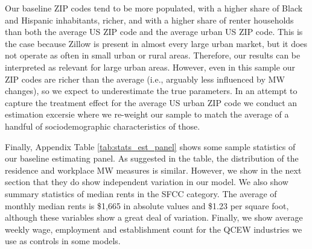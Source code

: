 Our baseline ZIP codes tend to be more populated, with a higher share of Black 
and Hispanic inhabitants, richer, and with a higher share of renter households 
than both the average US ZIP code and the average urban US ZIP code.
This is the case because Zillow is present in almost every large urban market, 
but it does not operate as often in small urban or rural areas.
Therefore, our results can be interpreted as relevant for large urban areas.
However, even in this sample our ZIP codes are richer than the average 
(i.e., arguably less influenced by MW changes), so we expect to underestimate 
the true parameters.
In an attempt to capture the treatment effect for the average US urban ZIP code 
we conduct an estimation excersie where we re-weight our sample to match the 
average of a handful of sociodemographic characteristics of those.

Finally, Appendix Table \ref{tab:stats_est_panel} shows some sample statistics 
of our baseline estimating panel.
As suggested in the table, the distribution of the residence and workplace MW 
measures is similar.
However, we show in the next section that they do show independent variation
in our model.
We also show summary statistics of median rents in the SFCC category.
The average of monthly median rents is \$1,665 in absolute values and \$1.23 
per square foot, although these variables show a great deal of variation.
Finally, we show average weekly wage, employment and establishment count 
for the QCEW industries we use as controls in some models.
